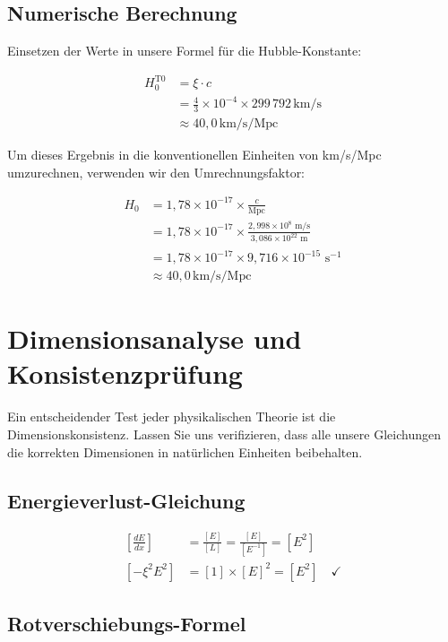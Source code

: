 \documentclass[12pt,a4paper]{article}
\begin{document}
	\subsection{Numerische Berechnung}
	
	Einsetzen der Werte in unsere Formel für die Hubble-Konstante:
	
	\begin{align}
		H_0^{\text{T0}} &= \xi \cdot c \\
		&= \frac{4}{3} \times 10^{-4} \times 299\,792\,\text{km/s} \\
		&\approx 40{,}0\,\text{km/s/Mpc}
	\end{align}
	
	Um dieses Ergebnis in die konventionellen Einheiten von km/s/Mpc umzurechnen, verwenden wir den Umrechnungsfaktor:
	
	\begin{align}
		H_0 &= 1{,}78 \times 10^{-17} \times \frac{c}{\text{Mpc}} \\
		&= 1{,}78 \times 10^{-17} \times \frac{2{,}998 \times 10^8 \text{ m/s}}{3{,}086 \times 10^{22} \text{ m}} \\
		&= 1{,}78 \times 10^{-17} \times 9{,}716 \times 10^{-15} \text{ s}^{-1} \\
		&\approx 40{,}0\,\text{km/s/Mpc}
	\end{align}
	
	\section{Dimensionsanalyse und Konsistenzprüfung}
	
	Ein entscheidender Test jeder physikalischen Theorie ist die Dimensionskonsistenz. Lassen Sie uns verifizieren, dass alle unsere Gleichungen die korrekten Dimensionen in natürlichen Einheiten beibehalten.
	
	\subsection{Energieverlust-Gleichung}
	
	\begin{align}
		\left[\frac{dE}{dx}\right] &= \frac{[E]}{[L]} = \frac{[E]}{[E^{-1}]} = [E^2] \\
		\left[-\xi^2 E^2\right] &= [1] \times [E]^2 = [E^2] \quad \checkmark
	\end{align}
	
	\subsection{Rotverschiebungs-Formel}
	
\end{document}
